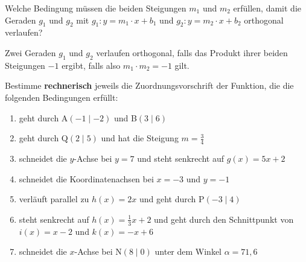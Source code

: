\documentclass[a4paper,ngerman,12pt]{exam}
\begin{document}
\begin{questions}
\begin{solution}
  \end{solution}
  \question %
  Welche Bedingung müssen die beiden Steigungen $m_1$ und $m_2$ erfüllen, damit die Geraden $g_1$ und $g_2$ mit $g_1: y=m_1\cdot x+b_1$ und $g_2: y=m_2\cdot x+b_2$ orthogonal verlaufen?\newline
  \begin{solution}
    Zwei Geraden $g_1$ und $g_2$ verlaufen orthogonal, falls das Produkt ihrer beiden Steigungen $-1$ ergibt, falls also $m_1\cdot m_2=-1$ gilt.
  \end{solution}
  \newpage
  \question %
  Bestimme \textbf{rechnerisch} jeweils die Zuordnungsvorschrift der Funktion, die die folgenden Bedingungen erfüllt:\\[2ex]
  \hspace{1cm}\begin{minipage}{0.9\textwidth}
    \begin{enumerate}[label=\alph*)]
      \item geht durch A$(-1\mid-2)$ und B$(3\mid6)$
      \item geht durch Q$(2\mid5)$ und hat die Steigung $m=\frac{3}{4}$
      \item schneidet die $y$-Achse bei $y=7$ und steht senkrecht auf $g(x)=5x+2$
      \item schneidet die Koordinatenachsen bei $x=-3$ und $y=-1$
      \item verläuft parallel zu $h(x)=2x$ und geht durch P$(-3\mid4)$
      \item {} steht senkrecht auf $h(x)=\frac{1}{3}x+2$ und geht durch den Schnittpunkt von $i(x)=x-2$ und $k(x)=-x+6$
      \item {} schneidet die $x$-Achse bei N$(8\mid0)$ unter dem Winkel $\alpha=71{,}6$\textdegree
    \end{enumerate}
  \end{minipage}


\end{questions}
\end{document}
